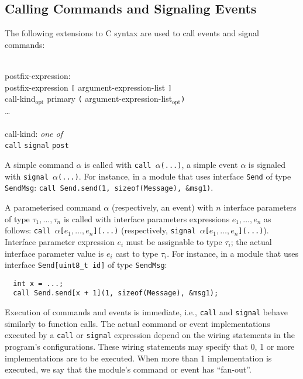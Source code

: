 \documentclass[11pt]{article}
\newcommand{\kw}[1]{{\tt #1}}
\newcommand{\code}[1]{{\tt #1}}
\newcommand{\opt}{$_{\mbox{opt}}$\xspace}
\begin{document}
\subsection{Calling Commands and Signaling Events}

The following extensions to C syntax are used to call events and signal
commands:
\em \begin{tabbing}
\hspace*{2cm}\= \\ \kill
postfix-expression:\\
\>	postfix-expression \kw{[} argument-expression-list \kw{]}\\
\>	call-kind\opt primary \kw{(} argument-expression-list\opt \kw{)}\\
\>	\ldots
\\\\
call-kind: \emph{one of}\\
\>	\kw{call} \kw{signal} \kw{post}
\end{tabbing} \rm

A simple command $\alpha$ is called with \code{call $\alpha$(...)}, a
simple event $\alpha$ is signaled with \code{signal $\alpha$(...)}. For
instance, in a module that uses interface \code{Send} of type \kw{SendMsg}:
\code{call Send.send(1, sizeof(Message), \&msg1)}.

A parameterised command $\alpha$ (respectively, an event) with $n$
interface parameters of type $\tau_1, \ldots, \tau_n$ is called with
interface parameters expressions $e_1, \ldots, e_n$ as follows: \code{call
$\alpha$[$e_1, \ldots, e_n$](...)}  (respectively, \code{signal
$\alpha$[$e_1, \ldots, e_n$](...)}). Interface parameter expression $e_i$
must be assignable to type $\tau_i$; the actual interface parameter value
is $e_i$ cast to type $\tau_i$. For instance, in a module that uses
interface \code{Send[uint8\_t id]} of type \kw{SendMsg}:

\begin{verbatim}
  int x = ...;
  call Send.send[x + 1](1, sizeof(Message), &msg1);
\end{verbatim}

Execution of commands and events is immediate, i.e., \kw{call} and
\kw{signal} behave similarly to function calls. The actual command or event
implementations executed by a \code{call} or \code{signal} expression
depend on the wiring statements in the program's configurations. These
wiring statements may specify that 0, 1 or more implementations are to be
executed. When more than 1 implementation is executed, we say that the
module's command or event has ``fan-out''.  
\end{document}

